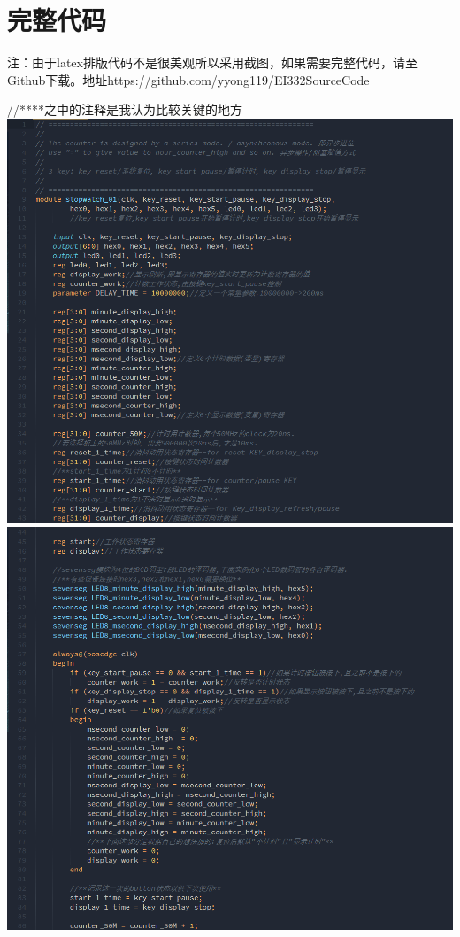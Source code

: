\documentclass{article}
\begin{document}
    \section{完整代码}
    
    \par 注：由于latex排版代码不是很美观所以采用截图，如果需要完整代码，请至Github下载。地址https://github.com/yyong119/EI332SourceCode
    \par //****之中的注释是我认为比较关键的地方
 	\newline
    \includegraphics[width=\textwidth]{1-43.png}
    \newline
    \includegraphics[width=\textwidth]{44-86.png}
\end{document}
